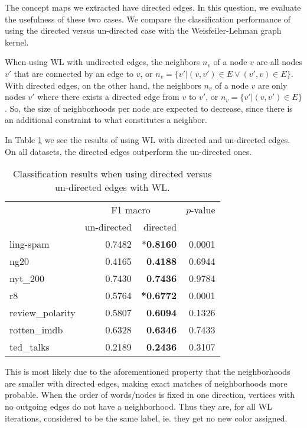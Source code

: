 The concept maps we extracted have directed edges.
In this question, we evaluate the usefulness of these two cases.
We compare the classification performance of using the directed versus un-directed case with the Weisfeiler-Lehman graph kernel.

When using WL with undirected edges, the neighbors $n_v$ of a node $v$ are all nodes $v'$ that are connected by an edge to $v$, or $n_v = \{v' | (v, v') \in E \lor (v', v ) \in E \}$.
With directed edges, on the other hand, the neighbors $n_v$ of a node $v$ are only nodes $v'$ where there exists a directed edge from $v$ to $v'$, or $n_v = \{v' | (v, v') \in E \}$.
So, the size of neighborhoods per node are expected to decrease, since there is an additional constraint to what constitutes a neighbor.

In Table \ref{table:results_directed_vs_undirected} we see the results of using WL with directed and un-directed edges.
On all datasets, the directed edges outperform the un-directed ones.

\begin{table}[htb!]
    \centering
\begin{tabular}{lrrr}
\toprule
    &  \multicolumn{2}{c}{F1 macro} & $p$-value\\
     &  un-directed & directed & \\
    \midrule
ling-spam       & 0.7482 & *\textbf{0.8160} & 0.0001 \\
ng20            & 0.4165 & \textbf{0.4188} & 0.6944 \\
nyt\_200         & 0.7430 & \textbf{0.7436} & 0.9784 \\
r8              & 0.5764 & \textbf{*0.6772} & 0.0001 \\
review\_polarity & 0.5807 & \textbf{0.6094} & 0.1326 \\
rotten\_imdb     & 0.6328 & \textbf{0.6346} & 0.7433 \\
ted\_talks       & 0.2189 & \textbf{0.2436} & 0.3107 \\
    \bottomrule
\end{tabular}
\caption[Results: WL with directed and un-directed edges]{Classification results when using directed versus un-directed edges with WL.}\label{table:results_directed_vs_undirected}
\end{table}

This is most likely due to the aforementioned property that the neighborhoods are smaller with directed edges, making exact matches of neighborhoods more probable.
When the order of words/nodes is fixed in one direction, vertices with no outgoing edges do not have a neighborhood. Thus they are, for all WL iterations, considered to be the same label, ie. they get no new color assigned.

